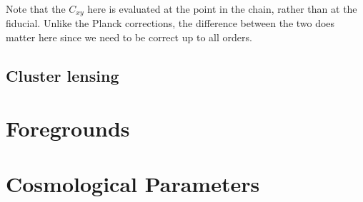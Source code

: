 \documentclass[a4paper, 11pt]{article}
\begin{document}
Note that the $C_{xy}$ here is evaluated at the point in the chain, rather than at the fiducial. Unlike the Planck corrections, the difference between the two does matter here since we need to be correct up to all orders.

\subsection{Cluster lensing}

\section{Foregrounds }


\section{Cosmological Parameters }
\end{document}
